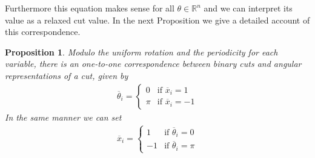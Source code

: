 \documentclass[12pt,a4paper]{article}
\theoremstyle{mythm}
\newtheorem{prop}[thm]{Proposition}
\begin{document}
Furthermore this equation makes sense for all $ \theta \in \mathbb{R} ^{ n }  $ and we can interpret its value as a relaxed cut value.
In the next Proposition we give a detailed account of this correspondence.
\begin{prop}
Modulo the uniform rotation and the periodicity for each variable, there is an one-to-one correspondence between binary cuts and angular representations
of a cut, given by
\begin{align}
\label{eq:ass1to1} 
\overline{ \theta } _{ i } = \begin{cases}
0 & \text{if } \overline{ x } _{ i } = 1 \\
\pi & \text{if } \overline{ x } _{ i } = -1
\end{cases}
\end{align} 
In the same manner we can set
\begin{align*}
\overline{ x } _{ i } = \begin{cases}
1 & \text{if } \overline{ \theta } _{ i } = 0 \\
-1 & \text{if } \overline{ \theta } _{ i  } = \pi
\end{cases}
\end{align*} 
\end{prop} 
\end{document}

